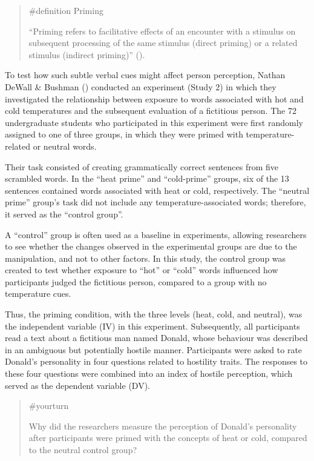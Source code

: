 \documentclass[
  letterpaper,
]{book}
\begin{document}
\begin{quote}
\label{def-priming}{\#definition} Priming

``Priming refers to facilitative effects of an encounter with a stimulus
on subsequent processing of the same stimulus (direct priming) or a
related stimulus (indirect priming)''
().
\end{quote}

To test how such subtle verbal cues might affect person perception,
Nathan DeWall \& Bushman ()
conducted an experiment (Study 2) in which they investigated the
relationship between exposure to words associated with hot and cold
temperatures and the subsequent evaluation of a fictitious person. The
72 undergraduate students who participated in this experiment were first
randomly assigned to one of three groups, in which they were primed with
temperature-related or neutral words.

Their task consisted of creating grammatically correct sentences from
five scrambled words. In the ``heat prime'' and ``cold-prime'' groups,
six of the 13 sentences contained words associated with heat or cold,
respectively. The ``neutral prime'' group's task did not include any
temperature-associated words; therefore, it served as the ``control
group''.

A ``control'' group is often used as a baseline in experiments, allowing
researchers to see whether the changes observed in the experimental
groups are due to the manipulation, and not to other factors. In this
study, the control group was created to test whether exposure to ``hot''
or ``cold'' words influenced how participants judged the fictitious
person, compared to a group with no temperature cues.

Thus, the priming condition, with the three levels (heat, cold, and
neutral), was the independent variable (IV) in this experiment.
Subsequently, all participants read a text about a fictitious man named
Donald, whose behaviour was described in an ambiguous but potentially
hostile manner. Participants were asked to rate Donald's personality in
four questions related to hostility traits. The responses to these four
questions were combined into an index of hostile perception, which
served as the dependent variable (DV).

\begin{quote}
{\#yourturn}

Why did the researchers measure the perception of Donald's personality
after participants were primed with the concepts of heat or cold,
compared to the neutral control group?
\end{quote}
\end{document}
